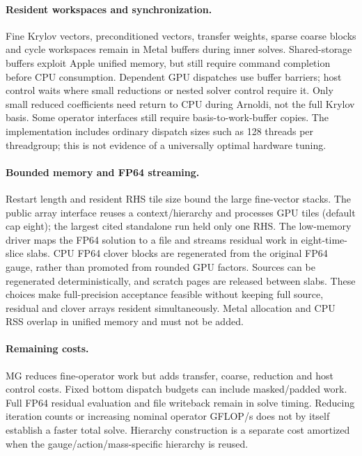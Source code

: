 \documentclass[11pt]{article}
\begin{document}
\paragraph{Resident workspaces and synchronization.}
Fine Krylov vectors, preconditioned vectors, transfer weights, sparse coarse
blocks and cycle workspaces remain in Metal buffers during inner solves.
Shared-storage buffers exploit Apple unified memory, but still require command
completion before CPU consumption. Dependent GPU dispatches use buffer barriers;
host control waits where small reductions or nested solver control require it.
Only small reduced coefficients need return to CPU during Arnoldi, not the full
Krylov basis. Some operator interfaces still require basis-to-work-buffer copies.
The implementation includes ordinary dispatch sizes such as 128 threads per
threadgroup; this is not evidence of a universally optimal hardware tuning.

\paragraph{Bounded memory and FP64 streaming.}
Restart length and resident RHS tile size bound the large fine-vector stacks.
The public array interface reuses a context/hierarchy and processes GPU tiles
(default cap eight); the largest cited standalone run held only one RHS.
The low-memory driver maps the FP64 solution to a file and streams residual
work in eight-time-slice slabs. CPU FP64 clover blocks are regenerated from
the original FP64 gauge, rather than promoted from rounded GPU factors.
Sources can be regenerated deterministically, and scratch pages are released
between slabs. These choices make full-precision acceptance feasible without
keeping full source, residual and clover arrays resident simultaneously.
Metal allocation and CPU RSS overlap in unified memory and must not be added.

\paragraph{Remaining costs.}
MG reduces fine-operator work but adds transfer, coarse, reduction and host
control costs. Fixed bottom dispatch budgets can include masked/padded work.
Full FP64 residual evaluation and file writeback remain in solve timing.
Reducing iteration counts or increasing nominal operator GFLOP/s does not by
itself establish a faster total solve. Hierarchy construction is a separate
cost amortized when the gauge/action/mass-specific hierarchy is reused.
\end{document}
